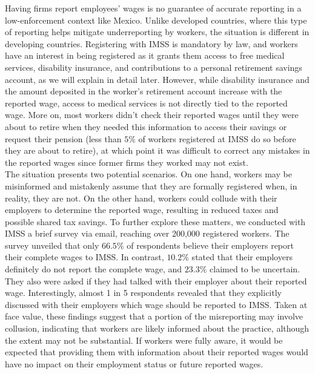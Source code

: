 \documentclass[10pt, oneside]{book}
\begin{document}
Having firms report employees' wages is no guarantee of accurate reporting in a low-enforcement context like Mexico. Unlike developed countries, where this type of reporting helps mitigate underreporting by workers, the situation is different in developing countries. Registering with IMSS is mandatory by law, and workers have an interest in being registered as it grants them access to free medical services, disability insurance, and contributions to a personal retirement savings account, as we will explain in detail later. However, while disability insurance and the amount deposited in the worker's retirement account increase with the reported wage, access to medical services is not directly tied to the reported wage. More on, most workers didn't check their reported wages until they were about to retire when they needed this information to access their savings or request their pension (less than $5\%$ of workers registered at IMSS do so before they are about to retire), at which point it was difficult to correct any mistakes in the reported wages since former firms they worked may not exist. \\

The situation presents two potential scenarios. On one hand, workers may be misinformed and mistakenly assume that they are formally registered when, in reality, they are not. On the other hand, workers could collude with their employers to determine the reported wage, resulting in reduced taxes and possible shared tax savings. To further explore these matters, we conducted with IMSS a brief survey via email, reaching over 200,000 registered workers. The survey unveiled that only $66.5\%$ of respondents believe their employers report their complete wages to IMSS. In contrast, $10.2\%$ stated that their employers definitely do not report the complete wage, and $23.3\%$ claimed to be uncertain. They also were asked if they had talked with their employer about their reported wage. Interestingly, almost 1 in 5 respondents revealed that they explicitly discussed with their employers which wage should be reported to IMSS. Taken at face value, these findings suggest that a portion of the misreporting may involve collusion, indicating that workers are likely informed about the practice, although the extent may not be substantial. If workers were fully aware, it would be expected that providing them with information about their reported wages would have no impact on their employment status or future reported wages. \\
\end{document}
